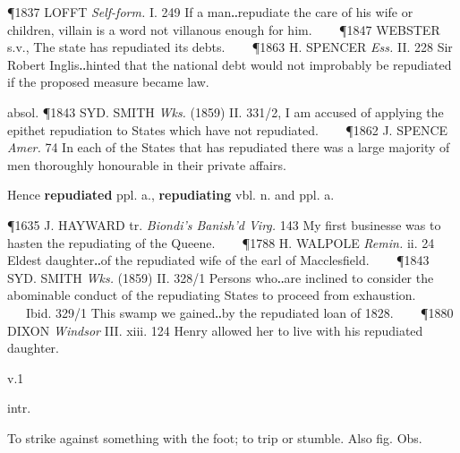 \begin{description}[wide, labelwidth=!, labelindent=0pt]
\begin{myenumerate}
\P 1837 LOFFT  \textit{Self-form.} I. 249 If a man‥repudiate the care of his wife or children, villain is a word not villanous enough for him.    
\P 1847 WEBSTER  s.v., The state has repudiated its debts.    
\P 1863 H. SPENCER  \textit{Ess.} II. 228 Sir Robert Inglis‥hinted that the national debt would not improbably be repudiated if the proposed measure became law.

absol. \P 1843 SYD. SMITH  \textit{Wks.} (1859) II. 331/2, I am accused of applying the epithet repudiation to States which have not repudiated.    
\P 1862 J. SPENCE  \textit{Amer.} 74 In each of the States that has repudiated there was a large majority of men thoroughly honourable in their private affairs.

\noindent Hence \textbf{repudiated} ppl. a., \textbf{repudiating} vbl. n. and ppl. a.

\P 1635 J. HAYWARD tr. \textit{Biondi's Banish'd Virg.} 143 My first businesse was to hasten the repudiating of the Queene.    
\P 1788 H. WALPOLE  \textit{Remin.} ii. 24 Eldest daughter‥of the repudiated wife of the earl of Macclesfield.    
\P 1843 SYD. SMITH  \textit{Wks.} (1859) II. 328/1 Persons who‥are inclined to consider the abominable conduct of the repudiating States to proceed from exhaustion.    Ibid. 329/1 This swamp we gained‥by the repudiated loan of 1828.    
\P 1880 DIXON  \textit{Windsor} III. xiii. 124 Henry allowed her to live with his repudiated daughter.
\end{myenumerate}


 v.1

\noindent {}

\noindent [OE. spurnan, spornan strong v. (pa. tense spearn, pa. pple. -spornen), = OS. spurnan, ON. *sporna (pa. tense sparn), related to the weak vbs. OHG. spornôn, ON. sporna, OHG. spurnan, -en, ON. spyrna, and OHG. (fir)spirnen, ON. sperna, MSw. and Sw. spjärna. The stem is prob. that of spur n.1 In OE. the simple verb is less frequent than the compound ætspurnan.]
\vspace{-0.3cm}

\begin{myenumerate}

 intr.

 To strike against something with the foot; to trip or stumble. Also fig. Obs.


\end{myenumerate}
\end{description}
